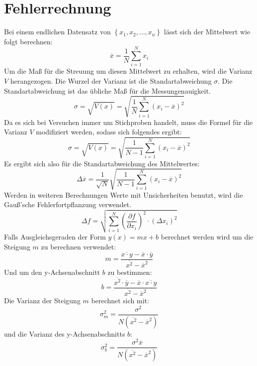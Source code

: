 \section{Fehlerrechnung}
\label{sec:Fehlerrechnung}

Bei einem endlichen Datensatz von $\left\{x_1,x_2,\ldots ,x_n\right\}$
lässt sich der Mittelwert wie folgt berechnen:
\begin{equation}
  \overline{x} =  \frac{1}{N} \sum_{i=1}^N x_i
\end{equation}
Um die Maß für die Streuung um diesen Mittelwert zu erhalten, wird die Varianz $V$
herangezogen. Die Wurzel der Varianz ist die Standartabweichung $\sigma$. Die
Standartabweichung ist das übliche Maß für die Messungenauigkeit.
\begin{equation}
  \sigma = \sqrt{V(x)} = \sqrt{\frac{1}{N} \sum_{i=1}^N \left(x_i-\overline{x}\right)^2}
\end{equation}
Da es sich bei Versuchen immer um Stichproben handelt, muss die Formel für die Varianz $V$
modifiziert werden, sodass sich folgendes ergibt:
\begin{equation}
  \sigma = \sqrt{V(x)} = \sqrt{\frac{1}{N-1} \sum_{i=1}^N \left(x_i-\overline{x}\right)^2}
\end{equation}
Es ergibt sich also für die Standartabweichung des Mittelwertes:
\begin{equation}
  \Delta \overline{x} = \frac{1}{\sqrt{N}}\sqrt{\frac{1}{N-1} \sum_{i=1}^N \left(x_i-\overline{x}\right)^2}
\end{equation}
Werden in weiteren Berechnungen Werte mit Unsicherheiten benutzt, wird
die Gauß'sche Fehlerfortpflanzung verwendet.
\begin{equation}
  \Delta f = \sqrt{\sum_{i=1}^N \left(\frac{\partial f}{\partial x_i}\right)^2 \cdot \left(\Delta x_i \right)^2}
\end{equation}
Falls Ausgleichsgeraden der Form $y(x)=mx+b$ berechnet werden wird um die Steigung $m$ zu berechnen verwendet:
\begin{equation}
  m=\frac{\overline{x \cdot y} - \overline{x} \cdot \overline{y}}{\overline{x^2} - \overline{x}^2}
\end{equation}
Und um den y-Achsenabschnitt $b$ zu bestimmen:
\begin{equation}
  b = \frac{\overline{x^2} \cdot \overline{y} - \overline{x} \cdot \overline{x \cdot y}}{\overline{x^2} - \overline{x}^2}
\end{equation}
Die Varianz der Steigung $m$ berechnet sich mit:
\begin{equation}
  \sigma_m^2 = \frac{\sigma^2}{N\left(\overline{x^2}-\overline{x}^2\right)}
\end{equation}
und die Varianz des y-Achsenabschnitts $b$:
\begin{equation}
  \sigma_b^2 = \frac{\sigma^2 \overline{x}}{N\left(\overline{x^2}-\overline{x}^2\right)}
\end{equation}
